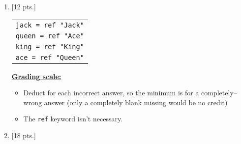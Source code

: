 \documentclass[11pt,fleqn]{article}
\begin{document}

  \vspace{-.5mm}

  \begin{enumerate}

    \addtolength{\itemsep}{20mm}

    \item {[12 pts.]}

          \begin{tabular}[t]{l}

            \texttt{jack = ref "Jack"}
              \\

            \texttt{queen = ref "Ace"}
              \\

            \texttt{king = ref "King"}
              \\

            \texttt{ace = ref "Queen"}
              \\

          \end{tabular}

          \begin{info}{\textbf{\underline{Grading scale:}}}

            \begin{itemize}

              \addtolength{\itemsep}{2mm}

              \item Deduct  for each incorrect answer, so the
                    minimum is  for a completely--wrong answer (only
                    a completely blank missing would be no credit)

              \item The \texttt{ref} keyword isn't necessary.

            \end{itemize}

          \end{info}

    \item {[18 pts.]}

          \vspace{-1mm}

          \begin{enumerate}

            \addtolength{\itemsep}{6mm}


\end{enumerate}
\end{enumerate}
\end{document}
